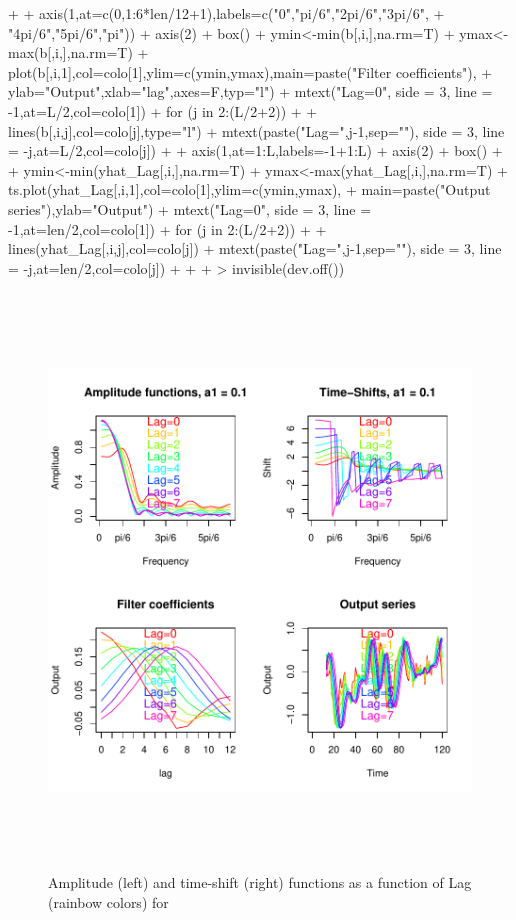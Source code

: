 \documentclass[a4paper]{book}
\begin{document}
\begin{enumerate}
\begin{Schunk}
\begin{Sinput}
{{+   }
+   axis(1,at=c(0,1:6*len/12+1),labels=c("0","pi/6","2pi/6","3pi/6",
+   "4pi/6","5pi/6","pi"))
+   axis(2)
+   box()
+   ymin<-min(b[,i,],na.rm=T)
+   ymax<-max(b[,i,],na.rm=T)
+   plot(b[,i,1],col=colo[1],ylim=c(ymin,ymax),main=paste("Filter coefficients"),
+   ylab="Output",xlab="lag",axes=F,typ="l")
+   mtext("Lag=0", side = 3, line = -1,at=L/2,col=colo[1])
+   for (j in 2:(L/2+2))
+   {
+     lines(b[,i,j],col=colo[j],type="l")
+     mtext(paste("Lag=",j-1,sep=""), side = 3, line = -j,at=L/2,col=colo[j])
+   }
+   axis(1,at=1:L,labels=-1+1:L)
+   axis(2)
+   box()
+ 
+   ymin<-min(yhat_Lag[,i,],na.rm=T)
+   ymax<-max(yhat_Lag[,i,],na.rm=T)
+   ts.plot(yhat_Lag[,i,1],col=colo[1],ylim=c(ymin,ymax),
+   main=paste("Output series"),ylab="Output")
+   mtext("Lag=0", side = 3, line = -1,at=len/2,col=colo[1])  
+   for (j in 2:(L/2+2))
+   {
+     lines(yhat_Lag[,i,j],col=colo[j])
+     mtext(paste("Lag=",j-1,sep=""), side = 3, line = -j,at=len/2,col=colo[j])
+   }
+ 
+ }
> invisible(dev.off())
\end{Sinput}
\end{Schunk}
\begin{figure}[H]\begin{center}\includegraphics[height=6in, width=6in]{z_dfa_ar1_amp_shift_Lag_0.pdf}\caption{Amplitude (left) and time-shift (right) functions as a function of Lag (rainbow colors) for
}
\end{center}
\end{figure}
\end{enumerate}
\end{document}
